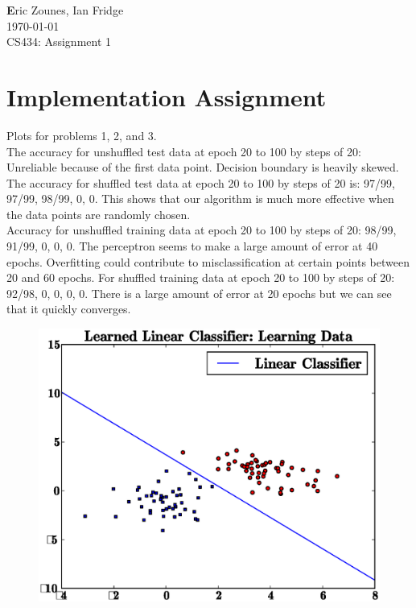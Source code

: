\documentclass[letterpaper,10pt,titlepage]{article}
\begin{document}
\begin{flushright}
\end{flushright}
\begin{flushleft}
\textbf Eric Zounes, Ian Fridge \\
\today  \\
CS434: Assignment 1 
\end{flushleft}
\section[1]{Implementation Assignment} 
\large Plots for problems 1, 2, and 3. \\ 

The accuracy for unshuffled test data at epoch 20 to 100 by steps of 20: Unreliable because of the first data point. Decision boundary is heavily skewed. The accuracy for shuffled test data  at epoch 20 to 100 by steps of 20 is: 97/99, 97/99, 98/99, 0, 0. This shows that our algorithm is much more effective when the data points are randomly chosen. \\
Accuracy for unshuffled training data at epoch 20 to 100 by steps of 20: 98/99, 91/99, 0, 0, 0. The perceptron seems to make a large amount of error at 40 epochs. Overfitting could contribute to misclassification at certain points between 20 and 60 epochs. For shuffled training data at epoch 20 to 100 by steps of 20: 92/98, 0, 0, 0, 0. There is a large amount of error at 20 epochs but we can see that it quickly converges. 
\begin{figure}[th!]
\centering
\includegraphics[width=5in]{learn.eps} 
\end{figure} 
\end{document}
